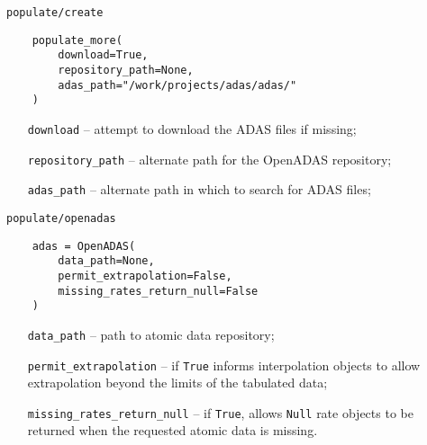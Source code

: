 \documentclass[../../main.tex]{subfiles}
\begin{document}
\texttt{populate/create}

\begin{verbatim}
    populate_more(
        download=True,
        repository_path=None,
        adas_path="/work/projects/adas/adas/"
    )
\end{verbatim}

\begin{itemize}[align=left]
    \item[\texttt{download}] -- attempt to download the ADAS files if missing;
    \item[\texttt{repository\_path}] -- alternate path for the OpenADAS repository;
    \item[\texttt{adas\_path}] -- alternate path in which to search for ADAS files;
\end{itemize}

\texttt{populate/openadas}

\begin{verbatim}
    adas = OpenADAS(
        data_path=None,
        permit_extrapolation=False,
        missing_rates_return_null=False
    )
\end{verbatim}

\begin{itemize}[align=left]
    \item[\texttt{data\_path}] -- path to atomic data repository;
    \item[\texttt{permit\_extrapolation}] -- if \texttt{True} informs interpolation objects to allow extrapolation beyond the limits of the tabulated data;
    \item[\texttt{missing\_rates\_return\_null}] -- if \texttt{True}, allows \texttt{Null} rate objects to be returned when the requested atomic data is missing.
\end{itemize}
\end{document}
